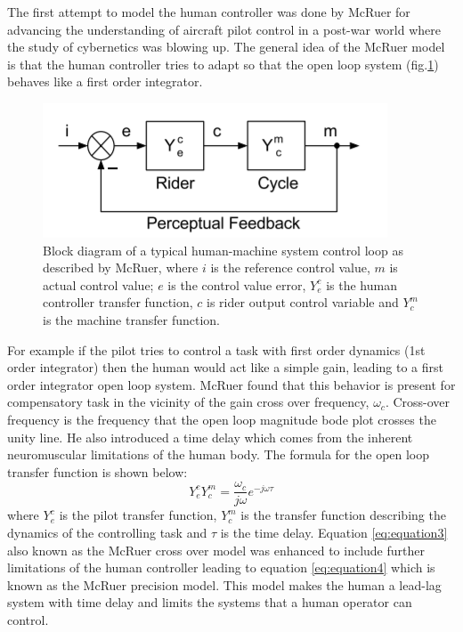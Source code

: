 The first attempt to model the human controller was done by McRuer for advancing the understanding of aircraft pilot control \cite{mcruer1967manual,mcruer1967manual2,mcruer1959human} in a post-war world where the study of cybernetics was blowing up. The general idea of the McRuer model is that the human controller tries to adapt so that the open loop system (fig.\ref{fig:figure5}) behaves like a first order integrator.
\begin{figure}[ht]
    \centering
    \includegraphics[scale=0.6]{images/figure3_4.png}
    \caption{Block diagram of a typical human-machine system control loop as described by McRuer, where \ensuremath{i} is the reference control value, \ensuremath{m} is actual control value; \ensuremath{e} is the control value error, \ensuremath{Y_e^c} is the human controller transfer function, \ensuremath{c} is rider output control variable and \ensuremath{Y_c^m} is the machine transfer function.\cite{kooijman2013review}}
    \label{fig:figure5}
\end{figure}
\par
For example if the pilot tries to control a task with first order dynamics (1st order integrator) then the human would act like a simple gain, leading to a first order integrator open loop system. McRuer found that this behavior is present for compensatory task in the vicinity of the gain cross over frequency, \ensuremath{\omega_c}. Cross-over frequency is the frequency that the open loop magnitude bode  plot crosses the unity line. He also introduced a time delay which comes from the inherent neuromuscular limitations of the human body. The formula for the open loop transfer function is shown below:
\begin{equation}
    Y_{e}^{c} Y_{c}^{m}=\frac{\omega_{c}}{j \omega} e^{-j \omega \tau}
    \label{eq:equation3}
\end{equation}
where \ensuremath{Y_e^c} is the pilot transfer function, \ensuremath{Y_c^m} is the transfer function describing the dynamics of the controlling task and \ensuremath{\tau} is the time delay. Equation \ref{eq:equation3} also known as the McRuer cross over model was enhanced to include further limitations of the human controller leading to equation \ref{eq:equation4} which is known as the McRuer precision model. This model makes the human a lead-lag system with time delay and limits the systems that a human operator can control.


